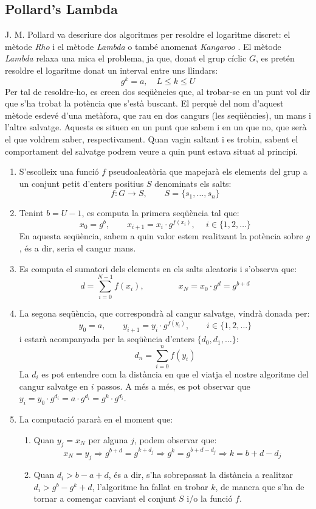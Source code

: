 \documentclass{article}
\begin{document}
\subsection{Pollard's Lambda}
J. M. Pollard \cite{pollard} va descriure dos algoritmes per resoldre el logaritme discret: el mètode \textit{Rho} i el mètode \textit{Lambda} o també anomenat \textit{Kangaroo} \cite{kangaroo}. El mètode \textit{Lambda } relaxa una mica el problema, ja que, donat el grup cíclic $G$, es pretén resoldre el logaritme donat un interval entre uns llindars:
\[g^k = a, \quad L \le k \le U\]
Per tal de resoldre-ho, es creen dos seqüències que, al trobar-se en un punt vol dir que s'ha trobat la potència que s'està buscant. El perquè del nom d'aquest mètode esdevé d'una metàfora, que rau en dos cangurs (les seqüències), un mans i l'altre salvatge. Aquests es situen en un punt que sabem i en un que no, que serà el que voldrem saber, respectivament. Quan vagin saltant i es trobin, sabent el comportament del salvatge podrem veure a quin punt estava situat al principi.
\begin{enumerate}
	\item S'escolleix una funció $f$ pseudoaleatòria que mapejarà els elements del grup a un conjunt petit d'enters positius $S$ denominats els salts:
	\[f : G \rightarrow S, \qquad S = \{s_1, \dots, s_n\}\]
	\item Tenint $b = U - 1$, es computa la primera seqüència tal que:
	\[x_0 = g^b, \qquad x_{i+1} = x_i \cdot g^{f(x_i)}, \quad \ i \in \{1, 2, \dots\}\]
	En aquesta seqüència, sabem a quin valor estem realitzant la potència sobre $g$, és a dir, seria el cangur mans.
	\item Es computa el sumatori dels elements en els salts aleatoris i s'observa que:
	\[d = \sum_{i=0}^{N - 1} f(x_i) ,  \qquad \qquad x_N = x_0 \cdot g^d = g^{b + d}\]
	\item La segona seqüència, que correspondrà al cangur salvatge, vindrà donada per:
	\[y_0 = a, \qquad y_{i+1} = y_i \cdot g^{f(y_i)}, \qquad i \in \{1, 2, \dots\}\]
	i estarà acompanyada per la seqüència d'enters $\{d_0, d_1, \dots \}$:
	\[d_n = \sum_{i=0}^{n}f(y_i)\]
	La $d_i$ es pot entendre com la distància en que el viatja el nostre algoritme del cangur salvatge en $i$ passos. A més a més, es pot observar que $y_i = y_0 \cdot g^{d_i} = a \cdot g^{d_i} = g^{k} \cdot g^{d_i}$.
	\item La computació pararà en el moment que:
	\begin{enumerate}[label=(\Alph*)]
		\item Quan $y_j = x_N$ per alguna $j$, podem observar que:
		\[x_N = y_j \Longrightarrow g^{b + d} = g^{k + d_j} \Longrightarrow g^k = g^{b + d - d_j} \Longrightarrow k = b + d - d_j\]
		\item Quan $d_i > b - a + d $, és a dir, s'ha sobrepassat la distància a realitzar $d_i > g^b - g^k + d$, l'algoritme ha fallat en trobar $k$, de manera que s'ha de tornar a començar canviant el conjunt $S$ i/o la funció $f$.
	\end{enumerate}
\end{enumerate}
\end{document}
